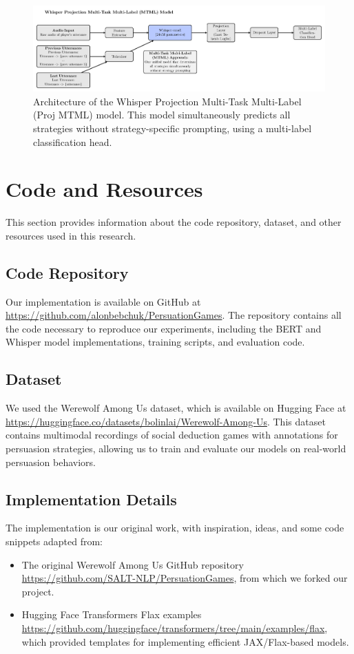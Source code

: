 \documentclass{article}
\begin{document}
\begin{figure}[H]
    \centering
    \includegraphics[width=\textwidth]{figures/png/whisper_proj_mtml.png}
    \caption{Architecture of the Whisper Projection Multi-Task Multi-Label (Proj MTML) model. This model simultaneously predicts all strategies without strategy-specific prompting, using a multi-label classification head.}
    \label{fig:app_whisper_proj_mtml}
\end{figure}

\section{Code and Resources}
This section provides information about the code repository, dataset, and other resources used in this research.

\subsection{Code Repository}
Our implementation is available on GitHub at \url{https://github.com/alonbebchuk/PersuationGames}. The repository contains all the code necessary to reproduce our experiments, including the BERT and Whisper model implementations, training scripts, and evaluation code.

\subsection{Dataset}
We used the Werewolf Among Us dataset, which is available on Hugging Face at \url{https://huggingface.co/datasets/bolinlai/Werewolf-Among-Us}. This dataset contains multimodal recordings of social deduction games with annotations for persuasion strategies, allowing us to train and evaluate our models on real-world persuasion behaviors.

\subsection{Implementation Details}
The implementation is our original work, with inspiration, ideas, and some code snippets adapted from:
\begin{itemize}
    \item The original Werewolf Among Us GitHub repository\\
    \url{https://github.com/SALT-NLP/PersuationGames}, from which we forked our project.
    \item Hugging Face Transformers Flax examples\\
    \url{https://github.com/huggingface/transformers/tree/main/examples/flax},\\
    which provided templates for implementing efficient JAX/Flax-based models.
\end{itemize}
\end{document}
